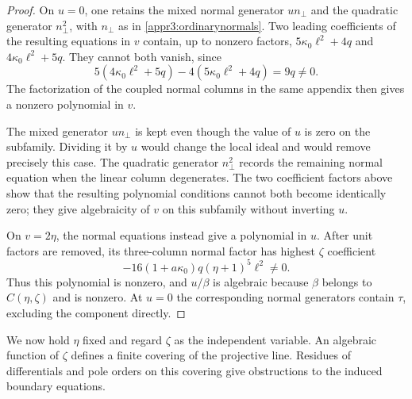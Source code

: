 \documentclass[11pt,a4paper]{article}
\numberwithin{equation}{section}
\theoremstyle{plain}
\theoremstyle{definition}
\theoremstyle{remark}
\begin{document}
\begin{proof}
On $u=0$, one retains the mixed normal generator $un_\perp$ and the
quadratic generator $n_\perp^2$, with $n_\perp$ as in
\eqref{appr3:ordinarynormals}. Two leading coefficients of the
resulting equations in $v$ contain, up to nonzero factors,
$5\kappa_0\ell^2+4q$ and $4\kappa_0\ell^2+5q$. They cannot both
vanish, since
\[
 5(4\kappa_0\ell^2+5q)-4(5\kappa_0\ell^2+4q)=9q\ne0.
\]
The factorization of the coupled normal columns in the same appendix
then gives a nonzero polynomial in $v$.

The mixed generator $un_\perp$ is kept even though the value of
$u$ is zero on the subfamily. Dividing it by $u$ would change the
local ideal and would remove precisely this case. The quadratic
generator $n_\perp^2$ records the remaining normal equation when
the linear column degenerates. The two coefficient factors above
show that the resulting polynomial conditions cannot both become
identically zero; they give algebraicity of $v$ on this subfamily
without inverting $u$.

On $v=2\eta$, the normal equations instead give a polynomial in
$u$. After unit factors are removed, its three-column normal factor
has highest $\zeta$ coefficient
\[
 -16(1+a\kappa_0)q(\eta+1)^5\ell^2\ne0.
\]
Thus this polynomial is nonzero, and $u/\beta$ is algebraic because
$\beta$ belongs to $C(\eta,\zeta)$ and is nonzero. At $u=0$ the
corresponding normal generators contain $\tau$, excluding the
component directly.
\end{proof}

We now hold $\eta$ fixed and regard $\zeta$ as the independent
variable. An algebraic function of $\zeta$ defines a finite covering
of the projective line. Residues of differentials and pole orders on
this covering give obstructions to the induced boundary equations.
\end{document}
